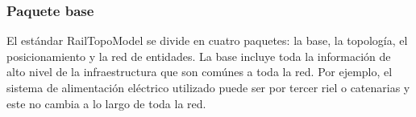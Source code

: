 \subsubsection{Paquete base}

    El estándar RailTopoModel se divide en cuatro paquetes: la base, la topología, el posicionamiento y la red de entidades. La base incluye toda la información de alto nivel de la infraestructura que son comúnes a toda la red. Por ejemplo, el sistema de alimentación eléctrico utilizado puede ser por tercer riel o catenarias y este no cambia a lo largo de toda la red.
